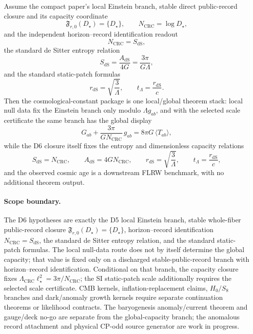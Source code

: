 \begin{theorem}
Assume the compact paper's local Einstein branch, stable direct public-record closure and its
capacity coordinate
\[
\mathfrak F_{r,0}(D_\star)=\{D_\star\},
\qquad N_{\mathrm{CRC}}=\log D_\star,
\]
and the independent horizon--record identification readout
\[
N_{\mathrm{CRC}}=S_{\mathrm{dS}},
\]
\noindent the standard de Sitter entropy relation
\[
S_{\mathrm{dS}}=\frac{A_{\mathrm{dS}}}{4G}=\frac{3\pi}{G\Lambda},
\]
and the standard static-patch formulas
\[
r_{\mathrm{dS}}=\sqrt{\frac{3}{\Lambda}},
\qquad
t_\Lambda=\frac{r_{\mathrm{dS}}}{c}.
\]
Then the cosmological-constant package is one local/global theorem stack: local null data fix the
Einstein branch only modulo \(\Lambda g_{ab}\), and with the selected scale certificate the same branch
has the global display
\[
G_{ab}+\frac{3\pi}{G N_{\mathrm{CRC}}}\,g_{ab}=8\pi G\,\langle T_{ab}\rangle,
\]
while the D6 closure itself fixes the entropy and dimensionless capacity relations
\[
S_{\mathrm{dS}}=N_{\mathrm{CRC}},
\qquad
A_{\mathrm{dS}}=4G N_{\mathrm{CRC}},
\qquad
r_{\mathrm{dS}}=\sqrt{\frac{3}{\Lambda}},
\qquad
t_\Lambda=\frac{r_{\mathrm{dS}}}{c},
\]
and the observed cosmic age is a downstream FLRW benchmark, with no additional theorem
output.
\end{theorem}

\paragraph{Scope boundary.}
The D6 hypotheses are exactly the D5 local Einstein branch, stable whole-fiber public-record
closure \(\mathfrak F_{r,0}(D_\star)=\{D_\star\}\), horizon--record identification
\(N_{\mathrm{CRC}}=S_{\mathrm{dS}}\), the standard de Sitter entropy relation, and the standard
static-patch formulas. The local null-data route does not by itself determine the global capacity;
that value is fixed only on a discharged stable-public-record branch with
horizon--record identification. Conditional on that branch, the capacity closure fixes
\(\Lambda_{\mathrm{CRC}}\ell_\star^2=3\pi/N_{\mathrm{CRC}}\); the SI static-patch scale
additionally requires the selected scale certificate. CMB kernels, inflation-replacement claims,
\(H_0/S_8\) branches and dark/anomaly growth kernels require separate continuation theorems or
likelihood contracts. The baryogenesis anomaly/current theorem and gauge/deck no-go are separate
from the global-capacity branch; the anomalous record attachment and physical CP-odd source generator are work in progress.

